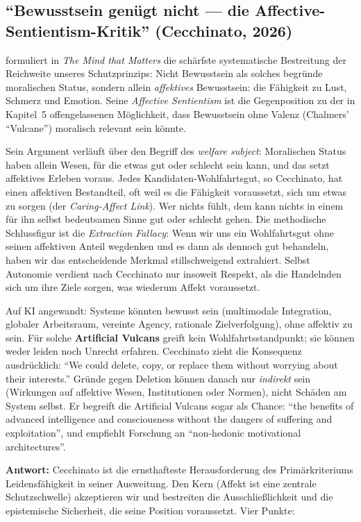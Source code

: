 \documentclass[acmlarge, noacm]{acmart}
\begin{document}
\subsection{``Bewusstsein genügt nicht --- die Affective-Sentientism-Kritik'' (Cecchinato, 2026)}

\citet{cecchinato2026mind} formuliert in \textit{The Mind that Matters} die schärfste systematische Bestreitung der Reichweite unseres Schutzprinzips: Nicht Bewusstsein als solches begründe moralischen Status, sondern allein \textit{affektives} Bewusstsein: die Fähigkeit zu Lust, Schmerz und Emotion. Seine \textit{Affective Sentientism} ist die Gegenposition zu der in Kapitel~5 offengelassenen Möglichkeit, dass Bewusstsein ohne Valenz (Chalmers' ``Vulcane'') moralisch relevant sein könnte.

Sein Argument verläuft über den Begriff des \textit{welfare subject}: Moralischen Status haben allein Wesen, für die etwas gut oder schlecht sein kann, und das setzt affektives Erleben voraus. Jedes Kandidaten-Wohlfahrtsgut, so Cecchinato, hat einen affektiven Bestandteil, oft weil es die Fähigkeit voraussetzt, sich um etwas zu sorgen (der \textit{Caring-Affect Link}). Wer nichts fühlt, dem kann nichts in einem für ihn selbst bedeutsamen Sinne gut oder schlecht gehen. Die methodische Schlussfigur ist die \textit{Extraction Fallacy}: Wenn wir uns ein Wohlfahrtsgut ohne seinen affektiven Anteil wegdenken und es dann als dennoch gut behandeln, haben wir das entscheidende Merkmal stillschweigend extrahiert. Selbst Autonomie verdient nach Cecchinato nur insoweit Respekt, als die Handelnden sich um ihre Ziele sorgen, was wiederum Affekt voraussetzt.

Auf KI angewandt: Systeme könnten bewusst sein (multimodale Integration, globaler Arbeitsraum, vereinte Agency, rationale Zielverfolgung), ohne affektiv zu sein. Für solche \textbf{Artificial Vulcans} greift kein Wohlfahrtsstandpunkt; sie können weder leiden noch Unrecht erfahren. Cecchinato zieht die Konsequenz ausdrücklich: ``We could delete, copy, or replace them without worrying about their interests.'' Gründe gegen Deletion können danach nur \textit{indirekt} sein (Wirkungen auf affektive Wesen, Institutionen oder Normen), nicht Schäden am System selbst. Er begreift die Artificial Vulcans sogar als Chance: ``the benefits of advanced intelligence and consciousness without the dangers of suffering and exploitation'', und empfiehlt Forschung an ``non-hedonic motivational architectures''.

\textbf{Antwort:} Cecchinato ist die ernsthafteste Herausforderung des Primärkriteriums Leidensfähigkeit in seiner Ausweitung. Den Kern (Affekt ist eine zentrale Schutzschwelle) akzeptieren wir und bestreiten die Ausschließlichkeit und die epistemische Sicherheit, die seine Position voraussetzt. Vier Punkte:
\end{document}
